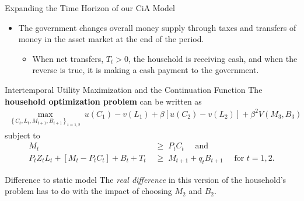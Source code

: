 \documentclass[10pt,c,aspectratio=1610,handout]{beamer}
\begin{document}
\begin{frame}{Expanding the Time Horizon of our CiA Model}
\begin{itemize}
\begin{small}
    \end{small}%
    \pause%
    \item[$\blacktriangleright$] The government changes overall money supply through taxes and transfers of money in the asset market at the end of the period.%
    \begin{small}%
      \begin{itemize}%
        \item[$\rightarrow$] When net transfers, $T_{t}>0$, the household is receiving cash, and when the reverse is true, it is making a cash payment to the government.%
      \end{itemize}%
    \end{small}%
  \end{itemize}%
\end{frame}%
\begin{frame}{Intertemporal Utility Maximization and the Continuation Function}%
  The \textbf{household optimization problem} can be written as%
  \begin{align*}%
    \max_{\left\{ C_{t},L_{t},M_{t+1},B_{t+1}\right\} _{t=1,2}}\ u(C_{1})-v(L_{1})+\beta \left[ u(C_{2})-v(L_{2})\right] +\beta^{2}V(M_{3},B_{3})%
  \end{align*}%
  \pause%
  subject to%
  \begin{align*}%
    M_{t} \; & \geq \; P_{t} C_{t} \quad \text{ and }\\%
    P_{t} Z_{t} L_{t} + \left[ M_{t} - P_{t}C_{t} \right] + B_{t} + T_{t} \; & \geq\;  M_{t+1}+ q_{t} B_{t+1} \quad \text{ for }t=1,2.%
  \end{align*}%
  \pause%
  \begin{block}{Difference to static model}%
    The \emph{real difference} in this version of the household's problem has to do with the impact of choosing $M_{2}$ and $B_{2}$.%
  \end{block}%
\end{frame}%
\end{document}
